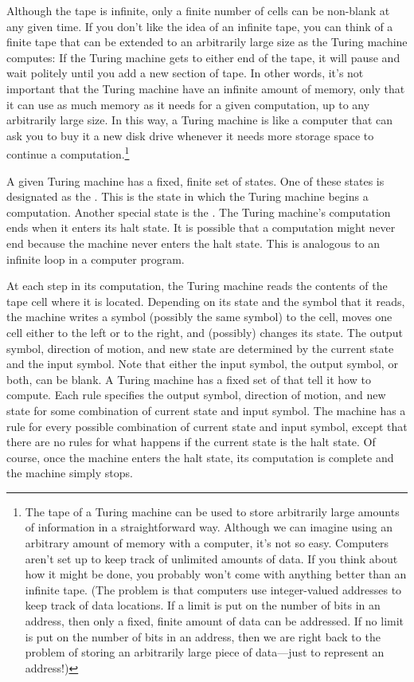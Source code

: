 Although the tape is infinite, only a finite number
of cells can be non-blank at any given time.  
If you don't like the idea
of an infinite tape, you can think of a finite tape that can be
extended to an arbitrarily large size as the Turing machine computes:
If the Turing machine gets to either end of the tape, it will pause and
wait politely until you add a new section of tape.  In other words,
it's not important that the Turing machine have an infinite amount of
memory, only that it can use as much memory as it needs for a given
computation, up to any arbitrarily large size.   In this way, a Turing
machine is like a computer that can ask you to buy it a new disk drive
whenever it needs more storage space to continue a computation.\footnote{The
tape of a Turing machine can be used to store arbitrarily large amounts of
information in a straightforward way.  Although we can imagine using
an arbitrary amount of memory with a computer, it's not so easy.  Computers
aren't set up to keep track of unlimited amounts of data.  If you think 
about how it might be done, you probably won't come with anything better
than an infinite tape. (The problem is that computers use integer-valued
addresses to keep track of data locations.  If a limit is put on
the number of bits in an address, then only a fixed, finite amount
of data can be addressed.  If no limit is put on the number of bits
in an address, then we are right back to the problem of storing an
arbitrarily large piece of data---just to represent an address!)}

A given Turing machine has a fixed, finite set of states.  One of
these states is designated as the .  This is the state in which the Turing machine begins a computation.
Another special state is the .  The Turing machine's computation ends when it enters its
halt state.  It is possible that a computation might never end because
the machine never enters the halt state.  This is analogous to an 
infinite loop in a computer program.

At each step in its computation,
the Turing machine reads the contents of the tape cell where it is located.
Depending on its state and the symbol that it reads, the machine
writes a symbol (possibly the same symbol) to the cell, moves one cell
either to the left or to the right, and (possibly) changes its state.
The output symbol, direction of motion, and new state are determined
by the current state and the input symbol.  Note that either the input
symbol, the output symbol, or both, can be blank. 
A Turing machine has a fixed set of 
that tell it how to compute.  Each rule
specifies the output symbol, direction of motion, and new state for
some combination of current state and input symbol.  The machine has
a rule for every possible combination of current state and input symbol,
except that there are no rules for what happens if the current state
is the halt state.  Of course, once the machine enters the halt state,
its computation is complete and the machine simply stops.

